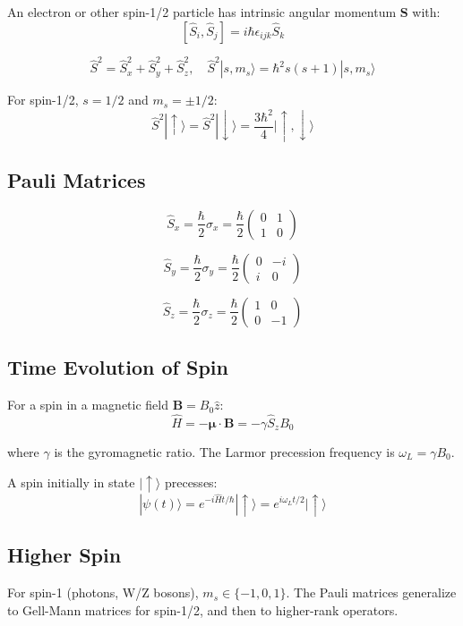 \documentclass[12pt,openany,oneside]{book}
\newcommand{\ket}[1]{|#1\rangle}
\begin{document}
{{{An electron or other spin-1/2 particle has intrinsic angular momentum $\mathbf{S}$ with:
\[
[\hat{S}_i, \hat{S}_j] = i\hbar\epsilon_{ijk}\hat{S}_k
\]

\[
\hat{S}^2 = \hat{S}_x^2 + \hat{S}_y^2 + \hat{S}_z^2, \quad \hat{S}^2\ket{s,m_s} = \hbar^2 s(s+1)\ket{s,m_s}
\]

For spin-1/2, $s = 1/2$ and $m_s = \pm 1/2$:
\[
\hat{S}^2\ket{\uparrow} = \hat{S}^2\ket{\downarrow} = \frac{3\hbar^2}{4}\ket{\uparrow,\downarrow}
\]

\subsection{Pauli Matrices}

\[
\hat{S}_x = \frac{\hbar}{2}\sigma_x = \frac{\hbar}{2}\begin{pmatrix} 0 & 1 \\ 1 & 0 \end{pmatrix}
\]

\[
\hat{S}_y = \frac{\hbar}{2}\sigma_y = \frac{\hbar}{2}\begin{pmatrix} 0 & -i \\ i & 0 \end{pmatrix}
\]

\[
\hat{S}_z = \frac{\hbar}{2}\sigma_z = \frac{\hbar}{2}\begin{pmatrix} 1 & 0 \\ 0 & -1 \end{pmatrix}
\]

\subsection{Time Evolution of Spin}

For a spin in a magnetic field $\mathbf{B} = B_0\hat{z}$:
\[
\hat{H} = -\boldsymbol{\mu} \cdot \mathbf{B} = -\gamma\hat{S}_z B_0
\]

where $\gamma$ is the gyromagnetic ratio. The Larmor precession frequency is $\omega_L = \gamma B_0$.

A spin initially in state $\ket{\uparrow}$ precesses:
\[
\ket{\psi(t)} = e^{-i\hat{H}t/\hbar}\ket{\uparrow} = e^{i\omega_L t/2}\ket{\uparrow}
\]

\subsection{Higher Spin}

For spin-1 (photons, W/Z bosons), $m_s \in \{-1, 0, 1\}$. The Pauli matrices generalize to Gell-Mann matrices for spin-1/2, and then to higher-rank operators.

}}}
\end{document}
